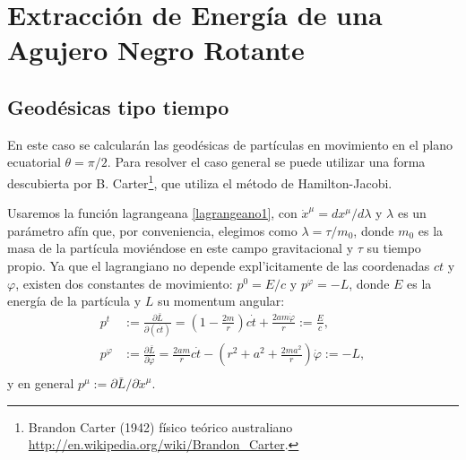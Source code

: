 %
%

\section{Extracci\'on de Energ\'ia de una Agujero Negro Rotante}

\subsection{Geod\'esicas tipo tiempo}

En este caso se calcular\'an las geod\'esicas de part\'iculas en movimiento en el plano ecuatorial $\theta=\pi/2$. Para resolver el caso general se puede utilizar una forma descubierta por B. Carter\footnote{Brandon Carter (1942) f\'isico te\'orico australiano \url{http://en.wikipedia.org/wiki/Brandon_Carter}.}, que utiliza el m\'etodo de Hamilton-Jacobi.

Usaremos la funci\'on lagrangeana \eqref{lagrangeano1}, con $\dot{x}^{\mu}=dx^{\mu}/d \lambda$ y $\lambda$ es un par\'ametro af\'in que, por conveniencia, elegimos como $\lambda=\tau/m_0$, donde $m_0$ es la masa de la part\'icula movi\'endose en este campo gravitacional y $\tau$ su tiempo propio. Ya que el lagrangiano no depende expl'icitamente de las coordenadas $ct$ y $\varphi$, existen dos constantes de movimiento: $p^0=E/c$ y $p^\varphi=-L$, donde $E$ es la energ\'ia de la part\'icula y $L$ su momentum angular:
\begin{equation}
\begin{aligned}
p^{t}&:=\frac{\partial \bar{L}}{\partial(c\dot{t})}=\left(1-\frac{2m}{r}\right)c\dot{t}+\frac{2am\dot{\varphi}}{r}:=\frac{E}{c},\\ 
p^{\varphi}&:=\frac{\partial \bar{L}}{\partial \dot{\varphi}}=\frac{2am}{r}c\dot{t}-\left(r^2+a^2+\frac{2ma^2}{r}\right)\dot{\varphi}:=-L,\\
\end{aligned}
\end{equation}
y en general $p^\mu:=\partial\bar{L}/\partial\dot{x}^\mu$.

